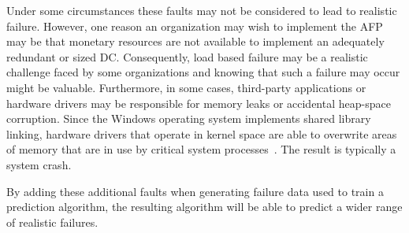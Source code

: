 Under some circumstances these faults may not be considered to lead to
realistic failure.  However, one reason an organization may wish to implement
the \ac{AFP} may be that monetary resources are not available to implement an
adequately redundant or sized \ac{DC}.  Consequently, load based failure may be
a realistic challenge faced by some organizations and knowing that such a
failure may occur might be valuable.  Furthermore, in some cases, third-party
applications or hardware drivers may be responsible for memory leaks or
accidental heap-space corruption.  Since the Windows operating system
implements shared library linking, hardware drivers that operate in kernel
space are able to overwrite areas of memory that are in use by critical system
processes~\cite{russinovich2009}.  The result is typically a system crash.

By adding these additional faults when generating failure data used to train a
prediction algorithm, the resulting algorithm will be able to predict a wider
range of realistic failures.  
